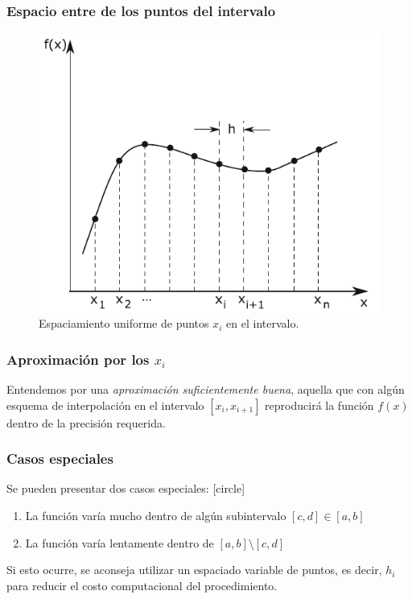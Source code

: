 \begin{frame}
\frametitle{Espacio entre de los puntos del intervalo}
\begin{figure}[h!]
    \centering
    \includegraphics[scale=0.5]{Imagenes/Diferencias_01_Espaciamiento.png}
    \caption{Espaciamiento uniforme de puntos $x_{i}$ en el intervalo.}
    \label{fig:figura_Diferenciacion_01}
\end{figure}
\end{frame}
\begin{frame}
\frametitle{Aproximación por los $x_{i}$}
Entendemos por una  \emph{aproximación suficientemente buena}, aquella que con algún esquema de interpolación en el intervalo $[x_{i}, x_{i+1}]$ reproducirá la función $f(x)$  dentro de la precisión requerida.
\end{frame}
\begin{frame}
\frametitle{Casos especiales}
Se pueden presentar dos casos especiales:
[circle]
\begin{enumerate}[<+->]
\item La función varía mucho dentro de algún subintervalo $[c, d] \in [a, b]$
\item La función varía lentamente dentro de $[a, b] \setminus [c, d]$
\end{enumerate}
\pause
Si esto ocurre, se aconseja utilizar un espaciado variable de puntos, es decir, $h_{i}$ para reducir el costo computacional del procedimiento.
\end{frame}

